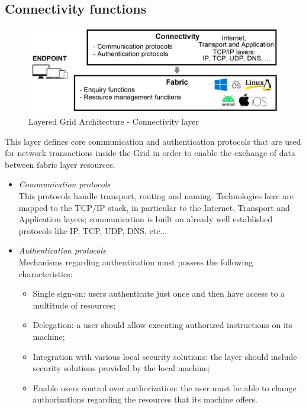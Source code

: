 \subsection{Connectivity functions}
\begin{figure}[!ht]
    \centering
    \includegraphics[scale=0.35]{document/chapters/chapter_2/images/connectivity_layer.png}
    \caption{Layered Grid Architecture - Connectivity layer}
    \label{fig:connectivity_layer}
\end{figure}
\vspace{5mm}

\noindent This layer defines core communication and authentication protocols that are used for network transactions inside the Grid in order to enable the exchange of data between fabric layer resources.
\begin{itemize}
    \item \textit{Communication protocols}\\
    This protocols handle transport, routing and naming. Technologies here are mapped to the TCP/IP stack, in particular to the Internet, Transport and Application layers; communication is built on already well established protocols like IP, TCP, UDP, DNS, etc... 
    \item \textit{Authentication protocols}\\
    Mechanisms regarding authentication must possess the following characteristics:
    \begin{itemize}
        \item Single sign-on: users authenticate just once and then have access to a multitude of resources;
        \item Delegation: a user should allow executing authorized instructions on its machine; 
        \item Integration with various local security solutions: the layer should include security solutions provided by the local machine;
        \item Enable users control over authorization: the user must be able to change authorizations regarding the resources that its machine offers.
    \end{itemize}
\end{itemize}

